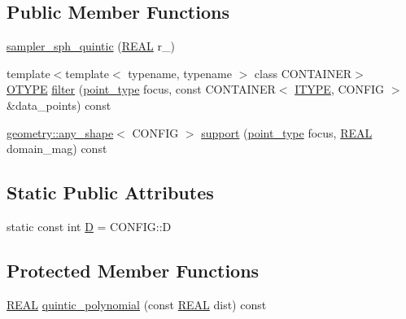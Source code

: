 \subsection*{Public Member Functions}
\begin{DoxyCompactItemize}
\item 
\hyperlink{classmui_1_1sampler__sph__quintic_a5440185ca454f8717d8a1b8ac7f46802}{sampler\+\_\+sph\+\_\+quintic} (\hyperlink{classmui_1_1sampler__sph__quintic_ab47a0d5297b716d51c2ab6857f586103}{R\+E\+AL} r\+\_\+)
\item 
{\footnotesize template$<$template$<$ typename, typename $>$ class C\+O\+N\+T\+A\+I\+N\+ER$>$ }\\\hyperlink{classmui_1_1sampler__sph__quintic_ae24222e54f6ab4358ad5b89a14c7af3a}{O\+T\+Y\+PE} \hyperlink{classmui_1_1sampler__sph__quintic_a5eb84f0e7f5d139116f0ba79ea5f2b4c}{filter} (\hyperlink{classmui_1_1sampler__sph__quintic_a81bf989d55a1247625c7783d9326d78b}{point\+\_\+type} focus, const C\+O\+N\+T\+A\+I\+N\+ER$<$ \hyperlink{classmui_1_1sampler__sph__quintic_a3814b885ebc0a019391849f0cf976d7e}{I\+T\+Y\+PE}, C\+O\+N\+F\+IG $>$ \&data\+\_\+points) const
\item 
\hyperlink{classmui_1_1geometry_1_1any__shape}{geometry\+::any\+\_\+shape}$<$ C\+O\+N\+F\+IG $>$ \hyperlink{classmui_1_1sampler__sph__quintic_a5576808cb3907b4f30fb07eaf5810425}{support} (\hyperlink{classmui_1_1sampler__sph__quintic_a81bf989d55a1247625c7783d9326d78b}{point\+\_\+type} focus, \hyperlink{classmui_1_1sampler__sph__quintic_ab47a0d5297b716d51c2ab6857f586103}{R\+E\+AL} domain\+\_\+mag) const
\end{DoxyCompactItemize}
\subsection*{Static Public Attributes}
\begin{DoxyCompactItemize}
\item 
static const int \hyperlink{classmui_1_1sampler__sph__quintic_a37f59cbab6227a9447be8f59a77067bd}{D} = C\+O\+N\+F\+I\+G\+::D
\end{DoxyCompactItemize}
\subsection*{Protected Member Functions}
\begin{DoxyCompactItemize}
\item 
\hyperlink{classmui_1_1sampler__sph__quintic_ab47a0d5297b716d51c2ab6857f586103}{R\+E\+AL} \hyperlink{classmui_1_1sampler__sph__quintic_ae7a2ca336d67f0311146356b23de2ec5}{quintic\+\_\+polynomial} (const \hyperlink{classmui_1_1sampler__sph__quintic_ab47a0d5297b716d51c2ab6857f586103}{R\+E\+AL} dist) const
\end{DoxyCompactItemize}
